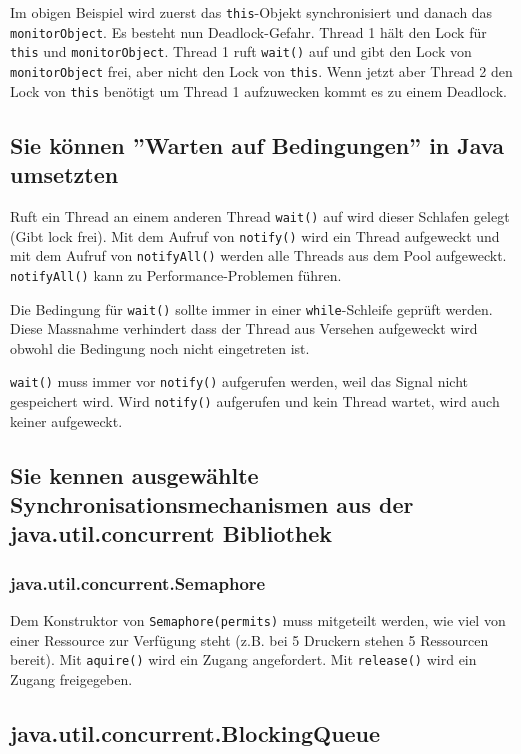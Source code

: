 Im obigen Beispiel wird zuerst das \texttt{this}-Objekt synchronisiert und danach das \texttt{monitorObject}. Es besteht nun Deadlock-Gefahr. Thread 1 hält den Lock für \texttt{this} und \texttt{monitorObject}. Thread 1 ruft \texttt{wait()} auf und gibt den Lock von \texttt{monitorObject} frei, aber nicht den Lock von \texttt{this}. Wenn jetzt aber Thread 2 den Lock von \texttt{this} benötigt um Thread 1 aufzuwecken kommt es zu einem Deadlock.


\subsection{Sie können ''Warten auf Bedingungen'' in Java umsetzten}

Ruft ein Thread an einem anderen Thread \texttt{wait()} auf wird dieser Schlafen gelegt (Gibt lock frei). Mit dem Aufruf von \texttt{notify()} wird ein Thread aufgeweckt und mit dem Aufruf von \texttt{notifyAll()} werden alle Threads aus dem Pool aufgeweckt. \texttt{notifyAll()} kann zu Performance-Problemen führen. 

Die Bedingung für \texttt{wait()} sollte immer in einer \texttt{while}-Schleife geprüft werden. Diese Massnahme verhindert dass der Thread aus Versehen aufgeweckt wird obwohl die Bedingung noch nicht eingetreten ist. 

\texttt{wait()} muss immer vor \texttt{notify()} aufgerufen werden, weil das Signal nicht gespeichert wird. Wird \texttt{notify()} aufgerufen und kein Thread wartet, wird auch keiner aufgeweckt.

\subsection{Sie kennen ausgewählte Synchronisationsmechanismen aus der java.util.concurrent Bibliothek}

\subsubsection{java.util.concurrent.Semaphore}

Dem Konstruktor von \texttt{Semaphore(permits)} muss mitgeteilt werden, wie viel von einer Ressource zur Verfügung steht (z.B. bei 5 Druckern stehen 5 Ressourcen bereit). Mit \texttt{aquire()} wird ein Zugang angefordert. Mit \texttt{release()} wird ein Zugang freigegeben.

\subsection{java.util.concurrent.BlockingQueue}

